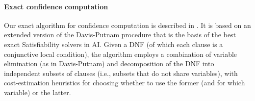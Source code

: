 \paragraph{Exact confidence computation}
%
Our exact algorithm for confidence computation is described in \cite{KO2008}. It is based on an extended version of the Davis-Putnam procedure \cite{DP1960} that is the basis of the best exact Satisfiability solvers in AI. Given a DNF (of which each clause is a conjunctive local condition), the algorithm employs a combination of variable elimination (as in Davis-Putnam) and decomposition of the DNF into independent subsets of clauses (i.e., subsets that do not share variables), with cost-estimation heuristics for choosing whether to use the former (and for which variable) or the latter.




